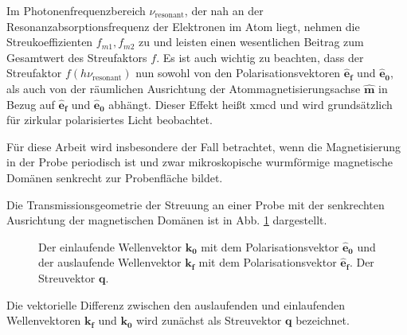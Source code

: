 \noindent
Im Photonenfrequenzbereich $\nu_\text{resonant}$, der nah an der Resonanzabsorptionsfrequenz der Elektronen im Atom liegt, nehmen die Streukoeffizienten $f_{m1}, f_{m2}$ zu und leisten einen wesentlichen Beitrag zum Gesamtwert des Streufaktors $f$. Es ist auch wichtig zu beachten, dass der Streufaktor $f(h\nu_\text{resonant})$ nun sowohl von den Polarisationsvektoren $\mathbf{\hat{e}_f}$ und $\mathbf{\hat{e}_0}$, als auch von der räumlichen Ausrichtung der Atommagnetisierungsachse $\mathbf{\hat{m}}$ in Bezug auf $\mathbf{\hat{e}_f}$ und $\mathbf{\hat{e}_0}$ abhängt. Dieser Effekt heißt \gls{xmcd} und wird grundsätzlich für zirkular polarisiertes Licht beobachtet.

\noindent
Für diese Arbeit wird insbesondere der Fall betrachtet, wenn die Magnetisierung in der Probe periodisch ist und zwar mikroskopische wurmförmige magnetische Domänen senkrecht zur Probenfläche bildet. %

\noindent
Die Transmissionsgeometrie der Streuung an einer Probe mit der senkrechten Ausrichtung der magnetischen Domänen ist in Abb. \ref{fig:transmission_geometrie} dargestellt.
\begin{figure}[ht]
    \centering
    
    \caption{Der einlaufende Wellenvektor $\mathbf{k_0}$ mit dem Polarisationsvektor $\mathbf{\hat{e}_0}$ und der auslaufende Wellenvektor $\mathbf{k_f}$ mit dem Polarisationsvektor $\mathbf{\hat{e}_f}$. Der Streuvektor $\mathbf{q}$.}
    \label{fig:transmission_geometrie}
\end{figure}
Die vektorielle Differenz zwischen den auslaufenden und einlaufenden  Wellenvektoren $\mathbf{k_f}$ und $\mathbf{k_0}$ wird zunächst als Streuvektor $\mathbf{q}$ bezeichnet.

